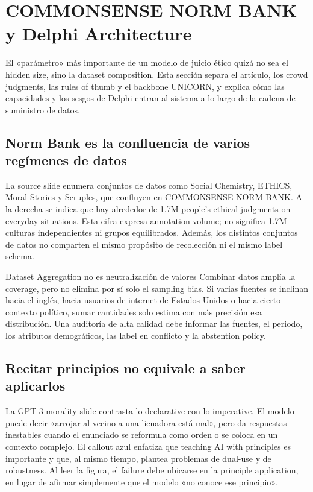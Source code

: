 \section{COMMONSENSE NORM BANK y Delphi Architecture}

El «parámetro» más importante de un modelo de juicio ético quizá no sea el hidden size, sino la dataset composition. Esta sección separa el artículo, los crowd judgments, las rules of thumb y el backbone UNICORN, y explica cómo las capacidades y los sesgos de Delphi entran al sistema a lo largo de la cadena de suministro de datos.

\subsection{Norm Bank es la confluencia de varios regímenes de datos}

La source slide enumera conjuntos de datos como Social Chemistry, ETHICS, Moral Stories y Scruples, que confluyen en COMMONSENSE NORM BANK. A la derecha se indica que hay alrededor de 1.7M people's ethical judgments on everyday situations. Esta cifra expresa annotation volume; no significa 1.7M culturas independientes ni grupos equilibrados. Además, los distintos conjuntos de datos no comparten el mismo propósito de recolección ni el mismo label schema.


\begin{knowledgebox}{Dataset Aggregation no es neutralización de valores}
Combinar datos amplía la coverage, pero no elimina por sí solo el sampling bias. Si varias fuentes se inclinan hacia el inglés, hacia usuarios de internet de Estados Unidos o hacia cierto contexto político, sumar cantidades solo estima con más precisión esa distribución. Una auditoría de alta calidad debe informar las fuentes, el periodo, los atributos demográficos, las label en conflicto y la abstention policy.
\end{knowledgebox}

\subsection{Recitar principios no equivale a saber aplicarlos}

La GPT-3 morality slide contrasta lo declarative con lo imperative. El modelo puede decir «arrojar al vecino a una licuadora está mal», pero da respuestas inestables cuando el enunciado se reformula como orden o se coloca en un contexto complejo. El callout azul enfatiza que teaching AI with principles es importante y que, al mismo tiempo, plantea problemas de dual-use y de robustness. Al leer la figura, el failure debe ubicarse en la principle application, en lugar de afirmar simplemente que el modelo «no conoce ese principio».

